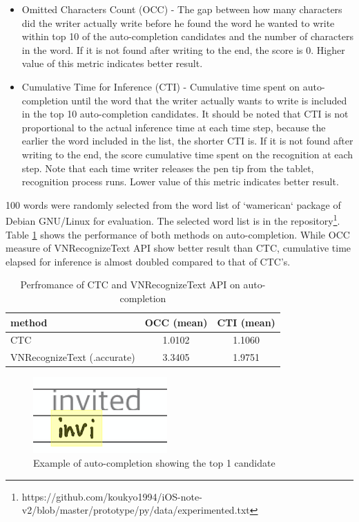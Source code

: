 \begin{itemize}
    \item Omitted Characters Count (OCC) - The gap between how many characters did the writer actually write before
    he found the word he wanted to write within top 10 of the auto-completion candidates
    and the number of characters in the word.
    If it is not found after writing to the end, the score is 0. Higher value of this metric indicates better result.
    \item Cumulative Time for Inference (CTI) - Cumulative time spent on auto-completion until the word that the writer actually
    wants to write is included in the top 10 auto-completion candidates. It should be noted that CTI is not proportional
    to the actual inference time at each time step, because the earlier the word included in the list, the shorter CTI is.
    If it is not found after writing to the end,
    the score cumulative time spent on the recognition at each step. Note that each time writer releases the pen tip from the tablet, recognition
    process runs. Lower value of this metric indicates better result.
\end{itemize}

100 words were randomly selected from the word list of `wamerican` package of Debian GNU/Linux for evaluation.
The selected word list is in the repository\footnote{https://github.com/koukyo1994/iOS-note-v2/blob/master/prototype/py/data/experimented.txt}.
Table \ref{tab:metrics} shows the performance of both methods on auto-completion. While OCC measure of
VNRecognizeText API show better result than CTC, cumulative time elapsed for inference is almost doubled
compared to that of CTC's.

\begin{table}[htbp]
    \centering
    \caption{Perfromance of CTC and VNRecognizeText API on auto-completion}
    \begin{tabular}{|l||c|c|} \hline
    method & OCC (mean) & CTI (mean) \\ \hline \hline
    CTC & 1.0102 & 1.1060 \\ \hline
    VNRecognizeText (.accurate) & 3.3405 & 1.9751 \\ \hline
    \end{tabular}
    \label{tab:metrics}
\end{table}

\begin{figure}
    \centering
    \includegraphics[]{images/auto-completion.png}
    \caption{Example of auto-completion showing the top 1 candidate}
    \label{fig:auto-complete}
\end{figure}

